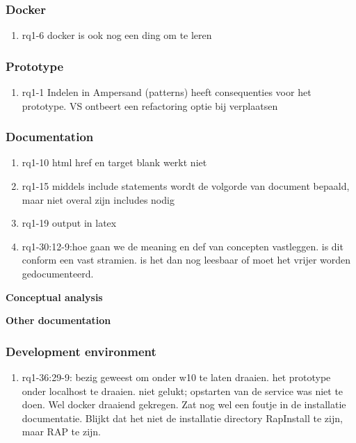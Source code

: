 \subsubsection{Docker}
\begin{comment}
plaats hier de afgehandelde items.
\end{comment}
\begin{enumerate}
    \item rq1-6 docker is ook nog een ding om te leren

\end{enumerate}

\subsubsection{Prototype}
\begin{comment}
plaats hier de afgehandelde items.
\end{comment}
\begin{enumerate}
    \item rq1-1 Indelen in Ampersand (patterns) heeft consequenties voor het prototype. VS ontbeert een refactoring optie bij verplaatsen
\end{enumerate}

\subsubsection{Documentation}
\begin{comment}
plaats hier de afgehandelde items.
\end{comment}
\begin{enumerate}
    \item rq1-10 html href en target blank werkt niet    
    \item rq1-15 middels include statements wordt de volgorde van document bepaald, maar niet overal zijn includes nodig
    \item rq1-19 output in latex 
    \item rq1-30:12-9:hoe gaan we de meaning en def van concepten vastleggen. is dit conform een vast stramien. is het dan nog leesbaar of moet het vrijer worden gedocumenteerd.
    
\end{enumerate}

\textbf{Conceptual analysis}

\textbf{Other documentation}

\subsubsection{Development environment}
\begin{comment}
plaats hier de afgehandelde items.
\end{comment}
\begin{enumerate}
    \item rq1-36:29-9: bezig geweest om onder w10 te laten draaien. het prototype onder localhost te draaien. niet gelukt; opstarten van de service was niet te doen. Wel docker draaiend gekregen. Zat nog wel een foutje in de installatie documentatie. Blijkt dat het niet de installatie directory RapInstall te zijn, maar RAP te zijn.
\end{enumerate}

